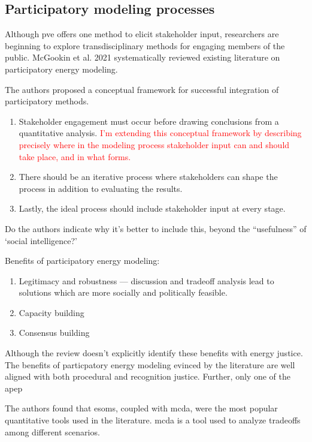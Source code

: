 \subsection{Participatory modeling processes}

Although \ac{pve} offers one method to elicit stakeholder input, researchers are
beginning to explore transdisciplinary methods for engaging members of the public.
McGookin et al. 2021 \cite{mcgookin_participatory_2021} systematically reviewed 
existing literature on participatory energy modeling.

The authors proposed a conceptual framework for successful integration of 
participatory methods.
\begin{enumerate}
    \item Stakeholder engagement must occur before drawing conclusions from a
    quantitative analysis. \textcolor{red}{I'm extending this conceptual framework
    by describing precisely where in the modeling process stakeholder input can 
    and should take place, and in what forms.}
    \item There should be an iterative process where stakeholders can shape the 
    process in addition to evaluating the results.
    \item Lastly, the ideal process should include stakeholder input at every stage.
\end{enumerate}
Do the authors indicate why it's better to include this, beyond the ``usefulness''
of `social intelligence?'

Benefits of participatory energy modeling:
\begin{enumerate}
    \item Legitimacy and robustness --- discussion and tradeoff analysis lead to
    solutions which are more socially and politically feasible.
    \item Capacity building
    \item Consensus building 
\end{enumerate}

Although the review doesn't explicitly identify these benefits with energy justice.
The benefits of particpatory energy modeling evinced by the literature are well 
aligned with both procedural and recognition justice. Further, only one of the apep


The authors found that \acp{esom}, coupled with \ac{mcda}, were the most popular 
quantitative tools used in the literature. \Ac{mcda} is a tool used to analyze 
tradeoffs among different scenarios. 

